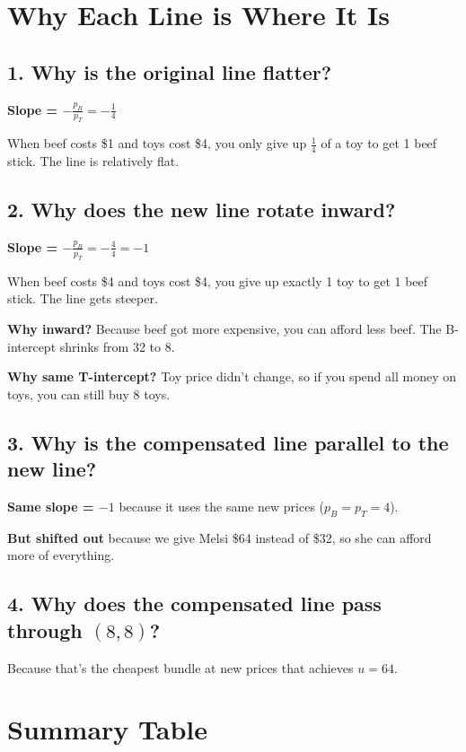 \documentclass[12pt]{article}
\begin{document}
\newpage

\section*{Why Each Line is Where It Is}

\subsection*{1. Why is the original line flatter?}

\textbf{Slope = $-\frac{p_B}{p_T} = -\frac{1}{4}$}

When beef costs \$1 and toys cost \$4, you only give up $\frac{1}{4}$ of a toy to get 1 beef stick. The line is relatively flat.

\subsection*{2. Why does the new line rotate inward?}

\textbf{Slope = $-\frac{p_B}{p_T} = -\frac{4}{4} = -1$}

When beef costs \$4 and toys cost \$4, you give up exactly 1 toy to get 1 beef stick. The line gets steeper.

\textbf{Why inward?} Because beef got more expensive, you can afford less beef. The B-intercept shrinks from 32 to 8.

\textbf{Why same T-intercept?} Toy price didn't change, so if you spend all money on toys, you can still buy 8 toys.

\subsection*{3. Why is the compensated line parallel to the new line?}

\textbf{Same slope = $-1$} because it uses the same new prices ($p_B = p_T = 4$).

\textbf{But shifted out} because we give Melsi \$64 instead of \$32, so she can afford more of everything.

\subsection*{4. Why does the compensated line pass through $(8,8)$?}

Because that's the cheapest bundle at new prices that achieves $u = 64$.

\section*{Summary Table}
\end{document}
